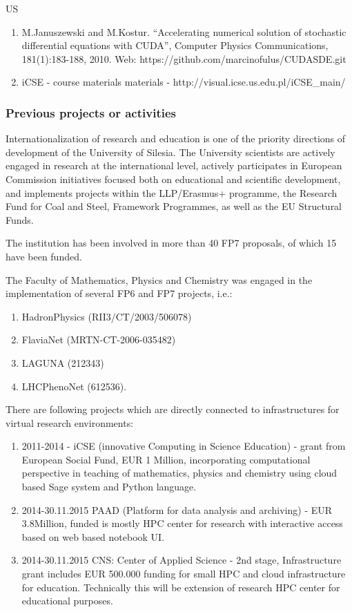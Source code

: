 \begin{sitedescription}{US}
\begin{enumerate}
\item  M.Januszewski and M.Kostur. ``Accelerating numerical solution of stochastic differential equations
with CUDA'',  Computer Physics Communications, 181(1):183-188, 2010. Web: https://github.com/marcinofulus/CUDASDE.git

\item iCSE - course materials  materials - http://visual.icse.us.edu.pl/iCSE\_main/

\end{enumerate}

\subsubsection*{Previous projects or activities}

Internationalization of research and education is one of the priority
directions of development of the University of Silesia. The University
scientists are actively engaged in research at the international
level, actively participates in European Commission initiatives
focused both on educational and scientific development, and implements
projects within the LLP/Erasmus+ programme, the Research Fund for Coal
and Steel, Framework Programmes, as well as the EU Structural Funds.

The institution has been involved in more than 40 FP7 proposals, of
which 15 have been funded.

The Faculty of Mathematics, Physics and Chemistry was engaged in the
implementation of several FP6 and FP7 projects, i.e.:

\begin{enumerate}
\item HadronPhysics (RII3/CT/2003/506078)
\item FlaviaNet (MRTN-CT-2006-035482)
\item LAGUNA (212343)
\item LHCPhenoNet (612536). 
\end{enumerate}

There are following projects which are directly connected to
infrastructures for virtual research environments:

\begin{enumerate}
\item 2011-2014 - iCSE (innovative Computing in Science Education) -
  grant from European Social Fund, EUR 1 Million, incorporating
  computational perspective in teaching of mathematics, physics and
  chemistry using cloud based Sage system and Python language.
\item 2014-30.11.2015 PAAD (Platform for data analysis and archiving) - EUR
  3.8Million, funded is mostly HPC center for research with
  interactive access based on web based notebook UI.
\item 2014-30.11.2015 CNS: Center of Applied Science - 2nd stage,
  Infrastructure grant includes EUR 500.000 funding for small HPC and
  cloud infrastructure for education. Technically this will be
  extension of research HPC center for educational purposes.
\end{enumerate}




\end{sitedescription}
